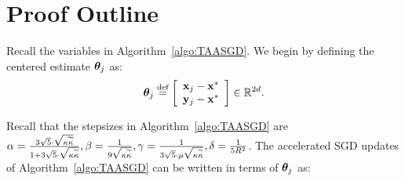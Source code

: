 \section{Proof Outline}\label{sec:proofoutline}
\iffalse We now present a brief outline of the proof of Theorem~\ref{thm:main}.\fi Recall the variables in Algorithm~\ref{algo:TAASGD}. \iffalse Before presenting the proof outline we require some definitions.\fi We begin by defining the centered estimate $\boldsymbol{\theta}_{j}$ as:%
\vspace{-0.2cm}
\begin{align*}
\boldsymbol{\theta}_{j} \stackrel{\textrm{def}}{=} \left[\begin{array}{c} \mathbf{x}_{j} - \mathbf{x}^* \\ \mathbf{y}_{j} - \mathbf{x}^* \end{array}\right]\in\mathbb{R}^{2d}. 
\end{align*}%

\vspace{-0.2cm}
\noindent Recall that the stepsizes in Algorithm~\ref{algo:TAASGD} are $\alpha = \frac{3\sqrt{5}\cdot\sqrt{{\kappa}\widetilde{\kappa}}}{1+3\sqrt{5}\cdot\sqrt{{\kappa}\widetilde{\kappa}}}, \beta = \frac{1}{9\sqrt{{\kappa}\widetilde{\kappa}}}, \gamma =  \frac{1}{3\sqrt{5}\cdot \mu \sqrt{{\kappa}\widetilde{\kappa}}}, \delta = \frac{1}{5R^2}$. The accelerated SGD updates of Algorithm~\ref{algo:TAASGD} can be written in terms of $\boldsymbol{\theta}_{j}$ as:%
\iffalse
\begin{align*}
\thetat &= \Ahatj \thetat[j-1] + \zetat, \quad \text{where,}\\
\Ahatj &\defeq \begin{bmatrix} 0 & (\eye-\delta\Hh[j])\\ -\alpha(1-\beta)\ \eye & (1+\alpha(1-\beta))\eye-(\alpha\delta+(1-\alpha)\gamma)\Hh[j] \end{bmatrix}\quad \text{and,}\\
\zetat[j] &\eqdef  \left[\begin{array}{c} \delta \cdot \ni[j] \ai[j] \\ (\alpha \delta + (1-\alpha)\gamma) \cdot \ni[j] \ai[j] \end{array}\right].
\end{align*}
\fi

